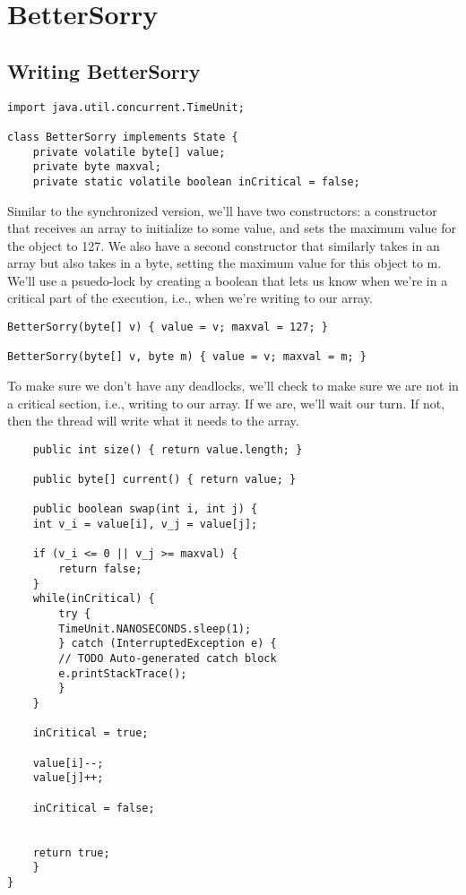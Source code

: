 \documentclass[11pt]{article}
\begin{document}
\section{BetterSorry}
\label{sec-6}
\subsection{Writing BetterSorry}
\label{sec-6-1}
\begin{verbatim}
import java.util.concurrent.TimeUnit;

class BetterSorry implements State {
    private volatile byte[] value;
    private byte maxval;
    private static volatile boolean inCritical = false;
\end{verbatim}

Similar to the synchronized version, we'll have two constructors: a
constructor that receives an array to initialize to some value, and
sets the maximum value for the object to 127. We also have a second
constructor that similarly takes in an array but also takes in a
byte, setting the maximum value for this object to m. We'll use a
psuedo-lock by creating a boolean that lets us know when we're in
a critical part of the execution, i.e., when we're writing to our
array.

\begin{verbatim}
BetterSorry(byte[] v) { value = v; maxval = 127; }

BetterSorry(byte[] v, byte m) { value = v; maxval = m; }
\end{verbatim}

To make sure we don't have any deadlocks, we'll check to make
sure we are not in a critical section, i.e., writing to
our array. If we are, we'll wait our turn. If not, then the
thread will write what it needs to the array.

\begin{verbatim}
    public int size() { return value.length; }

    public byte[] current() { return value; }

    public boolean swap(int i, int j) {
	int v_i = value[i], v_j = value[j];

	if (v_i <= 0 || v_j >= maxval) {
	    return false;
	}
	while(inCritical) {
	    try {
		TimeUnit.NANOSECONDS.sleep(1);
	    } catch (InterruptedException e) {
		// TODO Auto-generated catch block
		e.printStackTrace();
	    }
	}

	inCritical = true;

	value[i]--;
	value[j]++;

	inCritical = false;


	return true;
    }
}
\end{verbatim}
\end{document}
